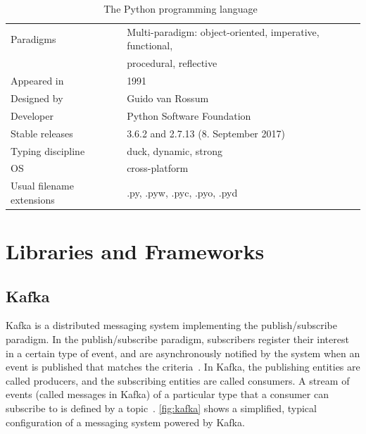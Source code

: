 \begin{table}
    \caption{The Python programming language~\cite{van2007python}}
    \label{table:python}
    \vspace{0.2cm}
    \begin{tabular}{l | l} %
        Paradigms
        & Multi-paradigm: object-oriented, imperative, functional,
        \\ & procedural, reflective
        \\ \midrule
        Appeared in
        & 1991
        \\ \midrule
        Designed by
        & Guido van Rossum
        \\ \midrule
        Developer
        & Python Software Foundation
        \\ \midrule
        Stable releases
        & 3.6.2 and 2.7.13 (8. September 2017)
        \\ \midrule
        Typing discipline
        & duck, dynamic, strong
        \\ \midrule
        OS
        & cross-platform
        \\ \midrule
        Usual filename extensions
        & .py, .pyw, .pyc, .pyo, .pyd
    \end{tabular}
\end{table}

\section{Libraries and Frameworks}
\label{sec:libraries}

\subsection{Kafka}
\label{subsec:kafka}

Kafka is a distributed messaging system implementing the publish/subscribe paradigm.
In the publish/subscribe paradigm, subscribers register their interest in a certain type of event,
and are asynchronously notified by the system when an event is published that matches the criteria~\cite{Eugster2003}.
In Kafka, the publishing entities are called producers, and the subscribing entities are called consumers.
A stream of events (called messages in Kafka) of a particular type that a consumer can subscribe to is defined by a topic~\cite{Kreps2015}.
\autoref{fig:kafka} shows a simplified, typical configuration of a messaging system powered by Kafka.

